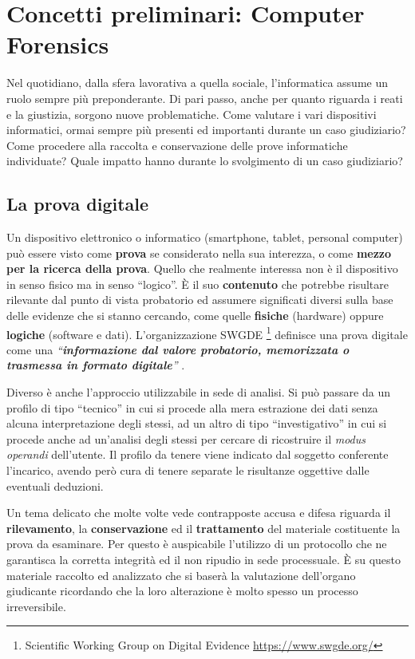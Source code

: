 \chapter{Concetti preliminari: Computer Forensics}

Nel quotidiano, dalla sfera lavorativa a quella sociale, l'informatica assume un ruolo sempre più preponderante. Di pari passo, anche per quanto riguarda i reati e la giustizia, sorgono nuove problematiche. Come valutare i vari dispositivi informatici, ormai sempre più presenti ed importanti durante un caso giudiziario? Come procedere alla raccolta e conservazione delle prove informatiche individuate? Quale impatto hanno durante lo svolgimento di un caso giudiziario? \nocite{Florindi}

\section{La prova digitale}

Un dispositivo elettronico o informatico (smartphone, tablet, personal computer) può essere visto come \textbf{prova} se considerato nella sua interezza, o come \textbf{mezzo per la ricerca della prova}. Quello che realmente interessa non è il dispositivo in senso fisico ma in senso ``logico''. \`E il suo \textbf{contenuto} che potrebbe risultare rilevante dal punto di vista probatorio ed assumere significati diversi sulla base delle evidenze che si stanno cercando, come quelle \textbf{fisiche} (hardware) oppure \textbf{logiche} (software e dati). L'organizzazione SWGDE \footnote{Scientific Working Group on Digital Evidence \url{https://www.swgde.org/}} definisce una prova digitale come una \textit{``\textbf{informazione dal valore probatorio, memorizzata o trasmessa in formato digitale}''} \cite{Swdge}.

Diverso è anche l'approccio utilizzabile in sede di analisi. Si può passare da un profilo di tipo ``tecnico'' in cui si procede alla mera estrazione dei dati senza alcuna interpretazione degli stessi, ad un altro di tipo ``investigativo'' in cui si procede anche ad un'analisi degli stessi per cercare di ricostruire il \textit{modus operandi} dell'utente. Il profilo da tenere viene indicato dal soggetto conferente l'incarico, avendo però cura di tenere separate le risultanze oggettive dalle eventuali deduzioni.

Un tema delicato che molte volte vede contrapposte accusa e difesa riguarda il \textbf{rilevamento}, la \textbf{conservazione} ed il \textbf{trattamento} del materiale costituente la prova da esaminare. Per questo è auspicabile l'utilizzo di un protocollo che ne garantisca la corretta integrità ed il non ripudio in sede processuale. \`E su questo materiale raccolto ed analizzato che si baserà la valutazione dell'organo giudicante ricordando che la loro alterazione è molto spesso un processo irreversibile.

